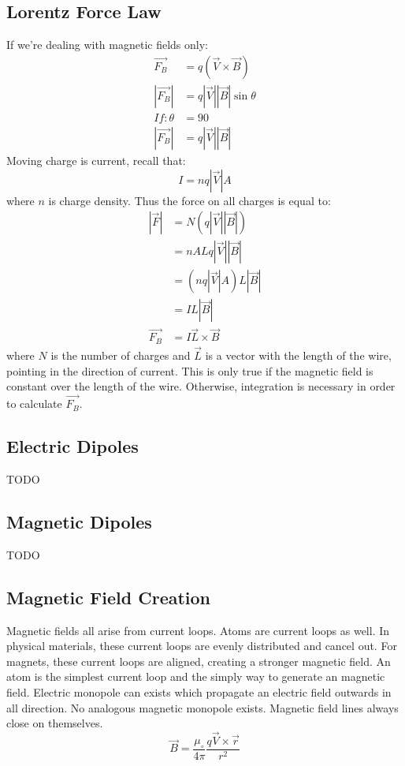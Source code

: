 \documentclass{math}
\begin{document}
\subsection*{Lorentz Force Law}
If we're dealing with magnetic fields only:
\begin{align*}
  \vec{F_B} &= q(\vec{V}\times\vec{B}) \\
  |\vec{F_B}| &= q|\vec{V}||\vec{B}|\sin\theta \\
  If: \theta &= 90 \\
  |\vec{F_B}| &= q|\vec{V}||\vec{B}|
\end{align*}
Moving charge is current, recall that:
\[ I = nq|\vec{V}|A \]
where \( n \) is charge density. Thus the force on all charges is equal to:
\begin{align*}
  |\vec{F}| &= N(q|\vec{V}||\vec{B}|) \\
  &= nALq|\vec{V}||\vec{B}| \\
  &= (nq|\vec{V}|A)L|\vec{B}| \\
  &= IL|\vec{B}| \\
  \vec{F_B} &= I\vec{L}\times\vec{B}
\end{align*}
where \( N \) is the number of charges and \( \vec{L} \) is a vector with the
length of the wire, pointing in the direction of current. This is only true if
the magnetic field is constant over the length of the wire. Otherwise,
integration is necessary in order to calculate \( \vec{F_B} \).

\subsection*{Electric Dipoles}
TODO

\subsection*{Magnetic Dipoles}
TODO

\subsection*{Magnetic Field Creation}
Magnetic fields all arise from current loops. Atoms are current loops as well.
In physical materials, these current loops are evenly distributed and cancel
out. For magnets, these current loops are aligned, creating a stronger magnetic
field. An atom is the simplest current loop and the simply way to generate an
magnetic field. Electric monopole can exists which propagate an electric field
outwards in all direction. No analogous magnetic monopole exists. Magnetic field
lines always close on themselves.
\[ \vec{B} = \frac{\mu_{\circ}}{4\pi}\frac{q\vec{V}\times\vec{r}}{r^2} \]
\end{document}

